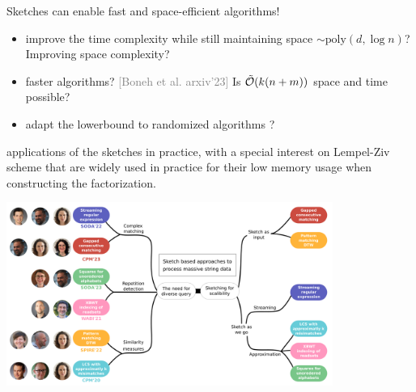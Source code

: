 \documentclass[aspectratio=169]{beamer}
\begin{document}
\begin{frame}
  \begin{center}
  \end{center}
   Sketches can enable fast and space-efficient algorithms!

  \medskip
  \begin{itemize}
    \item {} improve the time complexity while still maintaining space $\sim \mathrm{poly}(d,\log n)$? Improving space complexity?
    \item {} faster algorithms? \textcolor{gray}{[Boneh et al. arxiv'23]} Is $\tilde{\mathcal{O}}(k(n+m))$ space and time possible?
    \item {} adapt the lowerbound to randomized algorithms ?
  \end{itemize}

  \medskip
   applications of the sketches in practice, with a special interest on Lempel-Ziv scheme that are widely used in practice for their low memory usage when constructing the factorization.
\end{frame}

\backupbegin
\begin{frame}
  \vfill
  \bigskip
  \begin{center}
    \includegraphics[width=0.8\textwidth]{pictures/mindmap/5.png}
  \end{center}
  \vfill
\end{frame}



\begin{frame}
  \tableofcontents
\end{frame}
\backupend
\end{document}
